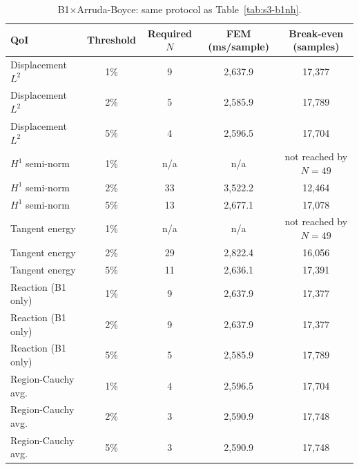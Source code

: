 \documentclass[11pt]{article}
\begin{document}
\begin{table}[h]
\centering
\caption{B1$\times$Arruda-Boyce: same protocol as Table~\ref{tab:s3-b1nh}.}
\label{tab:s3-b1ab}
\small
\begin{tabular}{lcccc}
\toprule
QoI & Threshold & Required $N$ & FEM (ms/sample) & Break-even (samples) \\
\midrule
Displacement $L^2$  & 1\% & 9   & 2{,}637.9 & 17{,}377 \\
Displacement $L^2$  & 2\% & 5   & 2{,}585.9 & 17{,}789 \\
Displacement $L^2$  & 5\% & 4   & 2{,}596.5 & 17{,}704 \\
$H^1$ semi-norm     & 1\% & n/a & n/a       & not reached by $N{=}49$ \\
$H^1$ semi-norm     & 2\% & 33  & 3{,}522.2 & 12{,}464 \\
$H^1$ semi-norm     & 5\% & 13  & 2{,}677.1 & 17{,}078 \\
Tangent energy      & 1\% & n/a & n/a       & not reached by $N{=}49$ \\
Tangent energy      & 2\% & 29  & 2{,}822.4 & 16{,}056 \\
Tangent energy      & 5\% & 11  & 2{,}636.1 & 17{,}391 \\
Reaction (B1 only)  & 1\% & 9   & 2{,}637.9 & 17{,}377 \\
Reaction (B1 only)  & 2\% & 9   & 2{,}637.9 & 17{,}377 \\
Reaction (B1 only)  & 5\% & 5   & 2{,}585.9 & 17{,}789 \\
Region-Cauchy avg.\ & 1\% & 4   & 2{,}596.5 & 17{,}704 \\
Region-Cauchy avg.\ & 2\% & 3   & 2{,}590.9 & 17{,}748 \\
Region-Cauchy avg.\ & 5\% & 3   & 2{,}590.9 & 17{,}748 \\
\bottomrule
\end{tabular}
\end{table}
\end{document}
